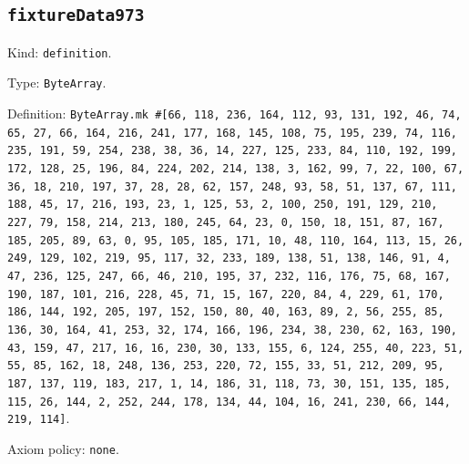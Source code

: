 \documentclass[11pt]{article}
\begin{document}
\subsection*{\texttt{fixtureData973}}
\noindent Kind: \texttt{definition}.\par
\noindent Type: \texttt{ByteArray}.\par
\noindent Definition: \texttt{ByteArray.mk \#[66, 118, 236, 164, 112, 93, 131, 192, 46, 74, 65, 27, 66, 164, 216, 241, 177, 168, 145, 108, 75, 195, 239, 74, 116, 235, 191, 59, 254, 238, 38, 36, 14, 227, 125, 233, 84, 110, 192, 199, 172, 128, 25, 196, 84, 224, 202, 214, 138, 3, 162, 99, 7, 22, 100, 67, 36, 18, 210, 197, 37, 28, 28, 62, 157, 248, 93, 58, 51, 137, 67, 111, 188, 45, 17, 216, 193, 23, 1, 125, 53, 2, 100, 250, 191, 129, 210, 227, 79, 158, 214, 213, 180, 245, 64, 23, 0, 150, 18, 151, 87, 167, 185, 205, 89, 63, 0, 95, 105, 185, 171, 10, 48, 110, 164, 113, 15, 26, 249, 129, 102, 219, 95, 117, 32, 233, 189, 138, 51, 138, 146, 91, 4, 47, 236, 125, 247, 66, 46, 210, 195, 37, 232, 116, 176, 75, 68, 167, 190, 187, 101, 216, 228, 45, 71, 15, 167, 220, 84, 4, 229, 61, 170, 186, 144, 192, 205, 197, 152, 150, 80, 40, 163, 89, 2, 56, 255, 85, 136, 30, 164, 41, 253, 32, 174, 166, 196, 234, 38, 230, 62, 163, 190, 43, 159, 47, 217, 16, 16, 230, 30, 133, 155, 6, 124, 255, 40, 223, 51, 55, 85, 162, 18, 248, 136, 253, 220, 72, 155, 33, 51, 212, 209, 95, 187, 137, 119, 183, 217, 1, 14, 186, 31, 118, 73, 30, 151, 135, 185, 115, 26, 144, 2, 252, 244, 178, 134, 44, 104, 16, 241, 230, 66, 144, 219, 114]}.\par
\noindent Axiom policy: \texttt{none}.\par
\end{document}
